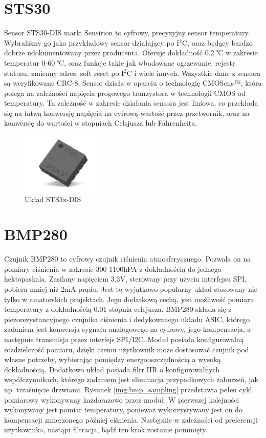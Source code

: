 \section{STS30}

Sensor STS30-DIS marki Sensirion to cyfrowy, precyzyjny sensor temperatury. Wybraliśmy go jako przykładowy sensor działający po I$^2$C, oraz będący bardzo dobrze udokumentowany przez producenta. Oferuje dokładność 0.2 ℃ w zakresie temperatur 0-60 ℃, oraz funkcje takie jak wbudowane ogrzewanie, rejestr statusu, zmienny adres, soft reset po I$^2$C i wiele innych\cite{sts_datasheet}. Wszystkie dane z sensora są weryfikowane CRC-8. Sensor działa w oparciu o technologię CMOSens™️, która polega na zależności napięcia progowego tranzystora w technologii CMOS od temperatury. Ta zależność w zakresie działania sensora jest liniowa, co przekłada się na łatwą konwersję napięcia na cyfrową wartość przez przetwornik, oraz na konwersję do wartości w stopniach Celsjusza lub Fahrenheita. 
\begin{figure}[H]
    \centering
    \includegraphics[width=4cm]{Graphics/sts_img.png}
    \caption{Układ STS3x-DIS\cite{sts_mouser}}
    \label{img:sts_mouser}
\end{figure}

\section{BMP280}

Czujnik BMP280 to cyfrowy czujnik ciśnienia atmosferycznego. Pozwala on na pomiary ciśnienia w zakresie 300-1100hPA z dokładnością do jednego hektopaskala. Zasilany napięciem 3.3V, sterowany przy użyciu interfejsu SPI, pobiera mniej niż 2mA prądu. Jest to wyjątkowo popularny układ stosowany nie tylko w amatorskich projektach. Jego dodatkową cechą, jest możliwość pomiaru temperatury z dokładnością 0.01 stopnia celcjusza\cite{bmp_datasheet}.
\newline
BMP280 składa się z piezorezystancyjnego czujnika ciśnienia i dedykowanego układu ASIC, którego zadaniem jest konwersja sygnału analogowego na cyfrowy, jego kompensacja, a następnie transmisja przez interfejs SPI/I2C. Moduł posiada konfigurowalną rozdzielczość pomiaru, dzięki czemu użytkownik może dostosować czujnik pod własne potrzeby, wybierając pomiędzy energooszczędnością a wysoką dokładnością. Dodatkowo układ posiada filtr IIR o konfigurowalnych współczynnikach, którego zadaniem jest eliminacja przypadkowych zaburzeń, jak np. trzaśnięcie drzwiami.
\newline
Rysunek \ref{img:bmp_sampling} przedstawia pełen cykl pomiarowy wykonywany każdorazowo przez moduł. W pierwszej kolejności wykonywany jest pomiar temperatury, ponieważ wykorzystywany jest on do kompensacji zmierzonego później ciśnienia. Następnie w zależności od preferencji użytkownika, nastąpi filtracja, bądź ten krok zostanie pominięty. 


